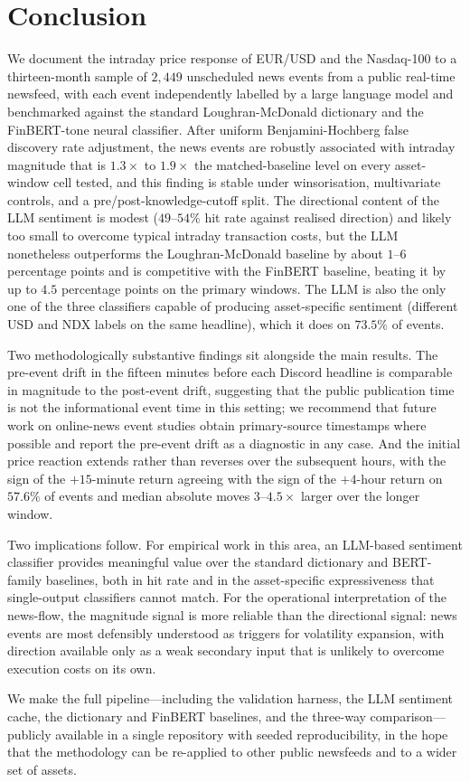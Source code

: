 \section{Conclusion}
\label{sec:conclusion}

We document the intraday price response of EUR/USD and the
Nasdaq-100 to a thirteen-month sample of $2{,}449$ unscheduled news
events from a public real-time newsfeed, with each event
independently labelled by a large language model and benchmarked
against the standard Loughran-McDonald dictionary and the
FinBERT-tone neural classifier. After uniform Benjamini-Hochberg
false discovery rate adjustment, the news events are robustly
associated with intraday magnitude that is $1.3\times$ to
$1.9\times$ the matched-baseline level on every asset-window cell
tested, and this finding is stable under winsorisation, multivariate
controls, and a pre/post-knowledge-cutoff split. The directional
content of the LLM sentiment is modest ($49$--$54\%$ hit rate
against realised direction) and likely too small to overcome
typical intraday transaction costs, but the LLM nonetheless
outperforms the Loughran-McDonald
baseline by about $1$--$6$ percentage points and is competitive
with the FinBERT baseline, beating it by up to $4.5$ percentage
points on the primary windows. The LLM is
also the only one of the three classifiers capable of producing
asset-specific sentiment (different USD and NDX labels on the same
headline), which it does on $73.5\%$ of events.

Two methodologically substantive findings sit alongside the main
results. The pre-event drift in the fifteen minutes before each
Discord headline is comparable in magnitude to the post-event
drift, suggesting that the public publication time is not the
informational event time in this setting; we recommend that future
work on online-news event studies obtain primary-source timestamps
where possible and report the pre-event drift as a diagnostic in
any case. And the initial price reaction extends rather than
reverses over the subsequent hours, with the sign of the
$+15$-minute return agreeing with the sign of the $+4$-hour return
on $57.6\%$ of events and median absolute moves $3$--$4.5\times$
larger over the longer window.

Two implications follow. For empirical work in this area, an
LLM-based sentiment classifier provides meaningful value over the
standard dictionary and BERT-family baselines, both in hit rate and
in the asset-specific expressiveness that single-output classifiers
cannot match. For the operational interpretation of the news-flow,
the magnitude signal is more reliable than the directional signal:
news events are most defensibly understood as triggers for
volatility expansion, with direction available only as a weak
secondary input that is unlikely to overcome execution costs on
its own.

We make the full pipeline---including the validation harness, the
LLM sentiment cache, the dictionary and FinBERT baselines, and the
three-way comparison---publicly available in a single repository
with seeded reproducibility, in the hope that the methodology can
be re-applied to other public newsfeeds and to a wider set of
assets.
